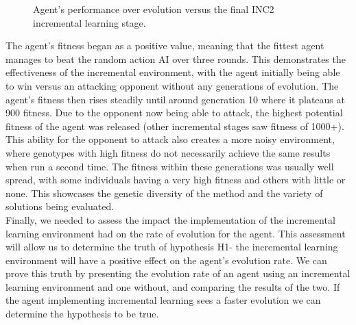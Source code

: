 \documentclass[12pt,a4paper]{article}
\begin{document}
\begin{figure}[h]
\begin{center}
\caption{Agent's performance over evolution versus the final INC2 incremental learning stage.}
\end{center}
\end{figure}
\newpage
The agent's fitness began as a positive value, meaning that the fittest agent manages to beat the random action AI over three rounds. This demonstrates the effectiveness of the incremental environment, with the agent initially being able to win versus an attacking opponent without any generations of evolution. The agent's fitness then rises steadily until around generation 10 where it plateaus at 900 fitness. Due to the opponent now being able to attack, the highest potential fitness of the agent was released (other incremental stages saw fitness of 1000+). This ability for the opponent to attack also creates a more noisy environment, where genotypes with high fitness do not necessarily achieve the same results when run a second time. The fitness within these generations was usually well spread, with some individuals having a very high fitness and others with little or none. This showcases the genetic diversity of the method and the variety of solutions being evaluated.\\

Finally, we needed to assess the impact the implementation of the incremental learning environment had on the rate of evolution for the agent. This assessment will allow us to determine the truth of hypothesis H1- the incremental learning environment will have a positive effect on the agent's evolution rate. We can prove this truth by presenting the evolution rate of an agent using an incremental learning environment and one without, and comparing the results of the two. If the agent implementing incremental learning sees a faster evolution we can determine the hypothesis to be true.\\
\end{document}
